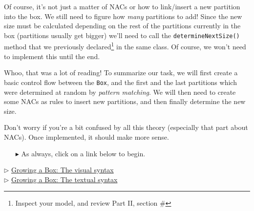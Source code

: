Of course, it's not just a matter of NACs or how to link/insert a new partition into the box. We still need to figure how \emph{many} partitions to add! Since
the new size must be calculated depending on the rest of the partitions currently in the box (partitions usually get bigger) we'll need to call the
\texttt{determineNextSize()} method that we previously declared\footnote{Inspect your model, and review Part II, section \#} in the same class. Of course, we 
won't need to implement this until the end.

Whoo, that was a lot of reading! To summarize our task, we will first create a basic control flow between the \texttt{Box}, and the first and the last
partitions which were determined at random by \emph{pattern matching}. We will then need to create some NACs as rules to insert new partitions, and then 
finally determine the new size.

Don't worry if you're a bit confused by all this theory (especially that part about \mbox{NAC}s). Once implemented, it should make more sense.

\vspace{0.5cm}
\begin{itemize}
\item[$\blacktriangleright$] As always, click on a link below to begin.
\end{itemize}

\begin{center} {$\triangleright$ \hyperlink{growBox vis}{Growing a Box: The visual syntax}}%
\\ \vspace{0.5cm}
 {$\triangleright$ \hyperlink{growBox vis}{Growing a Box: The textual syntax}}\end{center} 




